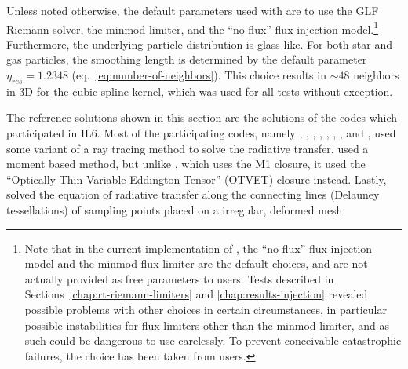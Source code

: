 Unless noted otherwise, the default parameters used with \GEARRT are to use the GLF Riemann
solver, the minmod limiter, and the ``no flux'' flux injection model.\footnote{
Note that in the current implementation of \GEARRT, the ``no flux'' flux injection model and the
minmod flux limiter are the default choices, and are not actually provided as free parameters to
users. Tests described in Sections~\ref{chap:rt-riemann-limiters} and \ref{chap:results-injection}
revealed possible problems with other choices in certain circumstances, in particular possible
instabilities for flux limiters other than the minmod limiter, and as such could be dangerous to use
carelessly. To prevent conceivable catastrophic failures, the choice has been taken from users.
} Furthermore, the underlying particle distribution is glass-like. For both star and gas particles,
the smoothing length is determined by the default parameter $\eta_{res} = 1.2348$
(eq.~\ref{eq:number-of-neighbors}). This choice results in $\sim 48$ neighbors in 3D for the cubic
spline kernel, which was used for all tests without exception.


The reference solutions shown in this section are the solutions of the codes which participated in
IL6. Most of the participating codes, namely
 \citep{mellema2RayNewMethod2006},
 \citep{ciardiCosmologicalReionizationFirst2001, maselliCRASHRadiativeTransfer2003},
 \citep{susaSmoothedParticleHydrodynamics2006},
 \citep{whalenMultistepAlgorithmRadiation2006},
 \citep{alvarezIIRegionFirst2006},
 \citep{nakamotoEffectsRadiativeTransfer2001},
 \citep{razoumovFullyThreadedTransport2005}, and
 \citep{rijkhorstHybridCharacteristics3D2006},
used some variant of a ray tracing method to solve the radiative transfer.
 \citep{gnedinMultidimensionalCosmologicalRadiative2001} used a moment based method,
but unlike \GEARRT, which uses the M1 closure,  it used the ``Optically Thin Variable Eddington
Tensor'' (OTVET) closure instead.
Lastly,  \citep{ritzerveldTriangulatingRadiationRadiative2004} solved the equation
of radiative transfer along the connecting lines (Delauney tessellations) of sampling points
placed on a irregular, deformed mesh.

